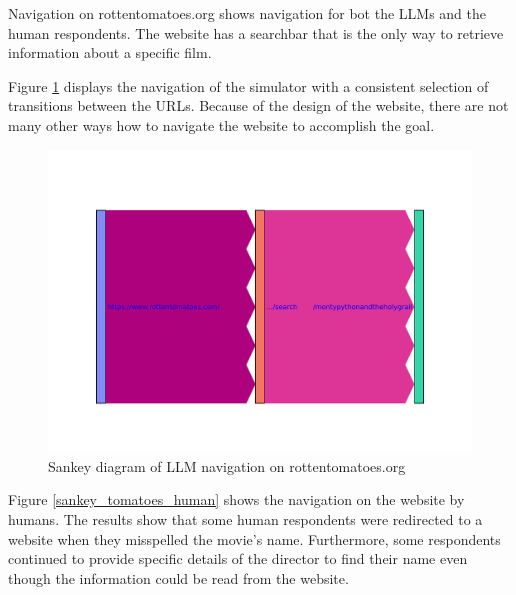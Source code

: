 Navigation on rottentomatoes.org shows navigation for bot the LLMs and the human respondents. The website has a searchbar that is the only way to retrieve information about a specific film. 

Figure \ref{sankey_tomatoes_llm} displays the navigation of the simulator with a consistent selection of transitions between the URLs. Because of the design of the website, there are not many other ways how to navigate the website to accomplish the goal. 

\begin{figure}[H]
    \centering
    \includegraphics[width=\textwidth]{obrazky-figures/sankey_rotten_tomatoes_llm.pdf}
    \caption{Sankey diagram of LLM navigation on rottentomatoes.org}
    \label{sankey_tomatoes_llm}
\end{figure}

Figure \ref{sankey_tomatoes_human} shows the navigation on the website by humans. The results show that some human respondents were redirected to a website when they misspelled the movie's name. Furthermore, some respondents continued to provide specific details of the director to find their name even though the information could be read from the website. 

